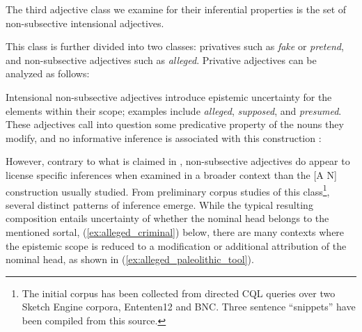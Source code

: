 \documentclass[10pt]{article}
\begin{document}
\vspace {-1.5mm}

The third adjective class we examine for their inferential properties is the set of non-subsective intensional adjectives. 

This class is further divided into two classes: privatives such as {\it fake} or {\it pretend}, and non-subsective adjectives such as \emph{alleged}. 
Privative adjectives can be analyzed as follows:
\vspace{-0.5em}
\vspace{-0.5em}

\noindent
Intensional non-subsective adjectives introduce epistemic uncertainty for the elements within their scope; 
examples include \emph{alleged}, \emph{supposed}, and \emph{presumed}. These adjectives call 
into question some predicative property of the nouns they modify, and no informative inference is associated with this construction \cite{Kamp95prototypetheory}:
\vspace{-.5em}
\vspace{-0.5em}

\noindent However, contrary to what is claimed in \cite{amoia2006adjective}, non-subsective adjectives do appear to license specific inferences when examined in a broader context than the [A N] construction usually studied. From preliminary corpus studies of this class\footnote{The initial corpus has been collected from directed CQL queries over  two Sketch Engine corpora, Ententen12 and BNC. Three sentence ``snippets'' have been compiled from this source.}, several distinct patterns of inference emerge. While the typical resulting composition entails  uncertainty of 
 whether the nominal head belongs to the mentioned sortal, (\ref{ex:alleged_criminal}) below, there are many contexts where the epistemic scope is reduced to  a modification or additional attribution of the nominal head, as shown in  (\ref{ex:alleged_paleolithic_tool}). 

\vspace{-0.5em}
\vspace{-0.5em}
\end{document}
